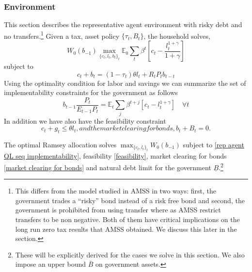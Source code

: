 \documentclass[11.5pt,twoside]{article}
\begin{document}
\subsubsection{Environment}

This section describes the representative agent environment with risky debt and no transfers.\footnote{
This differs from the model studied in AMSS in two ways:  first, the government trades a ``risky'' bond instead of a risk free bond and second, the government  is prohibited 
from using transfer where as AMSS restrict transfers to be non negative. Both of them have critical implications on the long run zero tax results that AMSS obtained. We discuss this later in the section.} Given a tax, asset policy $\{\tau_t,B_t\}$, the household solves,
\begin{equation}
W_0(b_{-1})\max_{\{c_t,l_t,b_{t}\}_t}\mathbb{E}_0\sum_{t}\beta^t \left[c_t-\frac{l_t^{1+\gamma}}{1+\gamma}\right]
\end{equation}
subject to
\begin{equation}
c_t+b_{t}=(1-\tau_t)\theta l_t+R_tP_tb_{t-t}
\end{equation}
Using the optimality condition for labor and savings we can summarize the set of implementability constraints for the government as follows
\begin{equation}
\label{rep agent QL seq implementability}
b_{t-1} \frac{P_t}{E_{t-1}P_t}=\mathbb{E}_t\sum_{j}\beta^{t+j}[c_t-l^{1+\gamma}_t] \quad \forall t
\end{equation}
In addition we have also have the feasibility constraint
\begin{subequations}
\begin{equation}
\label{feasibility}
c_t+g_t\leq\theta l_t,
\end{equation}
and the market clearing for bonds,
\begin{equation}\label{market clearing for bonds} b_t+B_t=0.\end{equation}
\end{subequations}

                                                            






\noindent The optimal Ramsey allocation solves  $\max_{\{c_t,l_t\}_t}W_0(b_{-1})$ subject to \eqref{rep agent QL seq implementability}, feasibility \eqref{feasibility}, market clearing for bonds \eqref{market clearing for bonds}  and natural debt limit for the government $\underline{B}$.\footnote{These will be explicitly derived for the cases we solve in this section. We also impose an upper bound $\overline{B}$ on government assets.}
\end{document}
